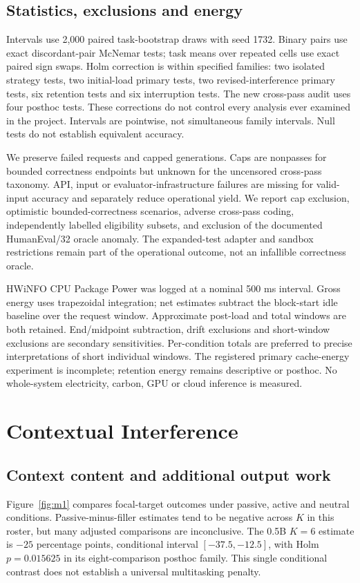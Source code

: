 \documentclass[10pt,a4paper,twocolumn]{article}
\begin{document}
\subsection{Statistics, exclusions and energy}
Intervals use 2,000 paired task-bootstrap draws with seed 1732. Binary pairs use
exact discordant-pair McNemar tests; task means over repeated cells use exact
paired sign swaps. Holm correction is within specified families: two isolated
strategy tests, two initial-load primary tests, two revised-interference primary
tests, six retention tests and six interruption tests. The new cross-pass audit
uses four posthoc tests. These corrections do not control every analysis ever
examined in the project. Intervals are pointwise, not simultaneous family
intervals. Null tests do not establish equivalent accuracy.

We preserve failed requests and capped generations. Caps are nonpasses
for bounded correctness endpoints but unknown for the uncensored cross-pass
taxonomy. API, input or evaluator-infrastructure failures are missing for
valid-input accuracy and separately reduce operational yield. We report cap
exclusion, optimistic bounded-correctness scenarios, adverse cross-pass coding,
independently labelled eligibility subsets, and exclusion of the documented
HumanEval/32 oracle anomaly. The expanded-test adapter and sandbox restrictions
remain part of the operational outcome, not an infallible correctness oracle.

HWiNFO CPU Package Power was logged at a nominal 500 ms interval. Gross energy
uses trapezoidal integration; net estimates subtract the block-start idle
baseline over the request window. Approximate post-load and total windows are
both retained. End/midpoint subtraction, drift exclusions and short-window
exclusions are secondary sensitivities. Per-condition totals are preferred to
precise interpretations of short individual windows. The registered primary
cache-energy experiment is incomplete; retention energy remains descriptive or
posthoc. No whole-system electricity, carbon, GPU or cloud inference is measured.

\section{Contextual Interference}
\subsection{Context content and additional output work}
Figure~\ref{fig:m1} compares focal-target outcomes under passive, active and
neutral conditions. Passive-minus-filler estimates tend to be negative across
$K$ in this roster, but many adjusted comparisons are inconclusive. The 0.5B
$K=6$ estimate is $-25$ percentage points, conditional interval $[-37.5,-12.5]$,
with Holm $p=0.015625$ in its eight-comparison posthoc family. This single
conditional contrast does not establish a universal multitasking penalty.
\end{document}

